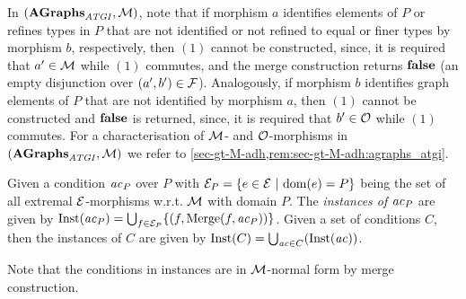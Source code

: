 \begin{remark}
\label{rem:mom}
In $(\mathbf{AGraphs}_\mathit{ATGI},{\cal M})$, note that if morphism $a$ identifies elements of $P$ or refines types in $P$ that are not identified or not refined to equal or finer types by morphism $b$, respectively, then $(1)$ cannot be constructed, since, it is required that $a' \in {\cal M}$ while $(1)$ commutes, and the merge construction returns $\textbf{false}$ (an empty disjunction over $(a',b')\in{\cal F}$).
Analogously, if morphism $b$ identifies graph elements of $P$ that are not identified by morphism $a$, then $(1)$ cannot be constructed and $\textbf{false}$ is returned, since, it is required that $b' \in {\cal O}$ while $(1)$ commutes.
For a characterisation of ${\cal M}$- and ${\cal O}$-morphisms in $(\mathbf{AGraphs}_\mathit{ATGI},{\cal M})$ we refer to \cref{sec-gt-M-adh,rem:sec-gt-M-adh:agraphs_atgi}.
\envEndMarker
\end{remark}

\begin{definition}
\label{def:sec-gc-gc:cond_inst}
Given a condition $\mathit{ac}_P$ over $P$ with $\mor{E}_P = \{e \in \mor{E}\ |\ \dom(e)=P\}$ being the set of all extremal $\mathcal{E}$-morphisms w.r.t. ${\cal M}$ with domain $P$.
The \emph{instances of $\mathit{ac}_P$} are given by $\mathrm{Inst}(\mathit{ac}_P)=\bigcup_{f \in {\cal E}_P}\{(f,\mathrm{Merge}(f,\mathit{ac}_P))\}$.
Given a set of conditions $C$, then the instances of $C$ are given by $\mathrm{Inst}(C)=\bigcup_{\mathit{ac} \in C}(\mathrm{Inst}(\mathit{ac}))$.
\envEndMarker
\end{definition}

\begin{remark}
\label{rem:sec-gc-gc:inst_m_norm_form}
Note that the conditions in instances are in ${\cal M}$-normal form by merge construction.
\envEndMarker
\end{remark}


